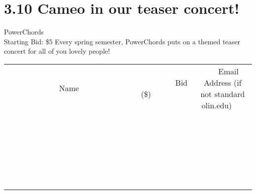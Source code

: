 \documentclass[11pt]{article}
\begin{document}
\section*{3.10 Cameo in our teaser concert!}
PowerChords
\\
Starting Bid: \$5
\newline
Every spring semester, PowerChords puts on a themed teaser concert for all of you lovely people!
\\[6ex]
\begin{tabular}{c c c}
~~~~~~~~~~~~~Name~~~~~~~~~~~~~ & ~~~~~~~~~Bid (\$)~~~~~~~~~  & ~~~Email Address (if not standard olin.edu)~~~\\
 & & \\
\hline
 & & \\
\hline
 & & \\
\hline
 & & \\
\hline
 & & \\
\hline
 & & \\
\hline
 & & \\
\hline
 & & \\
\hline
 & & \\
\hline
 & & \\
\hline
 & & \\
\hline
 & & \\
\hline
 & & \\
\hline
 & & \\
\hline
 & & \\
\hline
 & & \\
\hline
 & & \\
\hline
 & & \\
\hline
 & & \\
\hline
 & & \\
\hline
 & & \\
\hline
 & & \\
\hline
 & & \\
\hline
 & & \\
\hline
 & & \\
\hline
 & & \\
\hline
\end{tabular}
\newpage
\end{document}
